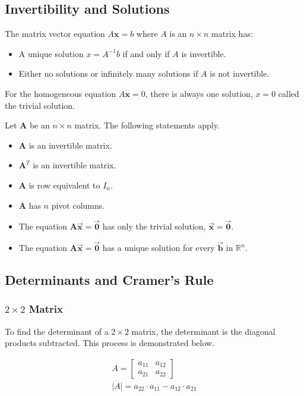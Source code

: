 \documentclass[12pt,landscape,twocolumn]{article}
\newcommand{\ma}[0]{\mathbf{A} }        %
\let\oldvec\vec
\renewcommand{\vec}[1]{\oldvec{\mathbf{ #1 } } }                    %
\begin{document}
    \subsection{Invertibility and Solutions}
    The matrix vector equation $A\mathbf{x} = b$ where $A$ is an $n \times n$ matrix has:
        \begin{itemize}
        \item A unique solution $x=A^{-1} b$ if and only if $A$ is invertible.
        \item Either no solutions or infinitely many solutions if $A$ is not invertible.
        \end{itemize}

    For the homogeneous equation $A \mathbf{x} = 0$, there is always one solution, $x=0$ called the trivial solution.

    Let $\ma$ be an $n \times n$ matrix. The following statements apply.
    \begin{itemize}
        \item $\ma$ is an invertible matrix.
        \item $\ma^T$ is an invertible matrix.
        \item $\ma$ is row equivalent to $I_n$.
        \item $\ma$ has $n$ pivot columns.
        \item The equation $\ma \vec{x} = \vec{0}$ has only the trivial solution, $\vec{x}=\vec{0}$.
        \item The equation $\ma \vec{x} = \vec{0}$ has a unique solution for every $\vec{b}$ in $\mathbb{R}^n$.
    \end{itemize}

    \subsection{Determinants and Cramer's Rule}
        \subsubsection{$2 \times 2$ Matrix}\label{subsubsec:22mat}
        To find the determinant of a $2 \times 2$ matrix, the determinant is the diagonal products subtracted. This process is demonstrated below.

        \begin{equation}\label{eq:22det}
        \begin{aligned}
            A =
            \left[\begin{array}{cc}
                a_{11} & a_{12}\\
                a_{21} & a_{22}
            \end{array}\right]\\
            \left| A \right| = a_{22} \cdot a_{11} - a_{12} \cdot a_{21}
        \end{aligned}
        \end{equation}
\end{document}
